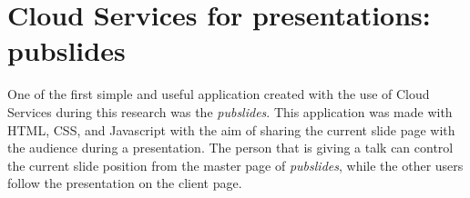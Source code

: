 %
%
%
%


\section{Cloud Services for presentations: pubslides}
\label{sec:apppubslides}

One of the first simple and useful application created with the use of Cloud Services during this research was the \textit{pubslides}.
This application was made with HTML, CSS, and Javascript with the aim of sharing the current slide page with the audience during a presentation.
The person that is giving a talk can control the current slide position from the master page of \textit{pubslides}, while the other users follow the presentation on the client page.

